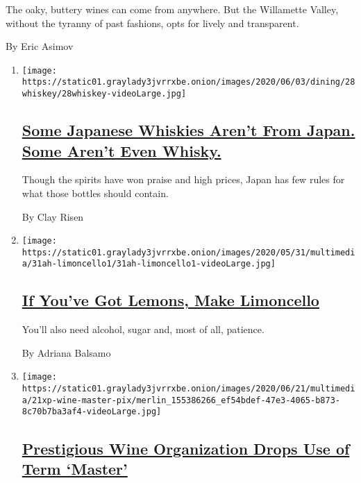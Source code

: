 \begin{enumerate}
\begin{enumerate}
    The oaky, buttery wines can come from anywhere. But the Willamette
    Valley, without the tyranny of past fashions, opts for lively and
    transparent.

    By Eric Asimov
  \end{enumerate}
\end{enumerate}

\begin{enumerate}
\def\labelenumi{\arabic{enumi}.}
\item
  \texttt{[image: https://static01.graylady3jvrrxbe.onion/images/2020/06/03/dining/28whiskey/28whiskey-videoLarge.jpg]}

  \hypertarget{some-japanese-whiskies-arent-from-japan-some-arent-even-whisky}{%
  \subsection{\texorpdfstring{\href{/2020/05/29/dining/japanese-whisky.html}{Some
  Japanese Whiskies Aren't From Japan. Some Aren't Even
  Whisky.}}{Some Japanese Whiskies Aren't From Japan. Some Aren't Even Whisky.}}\label{some-japanese-whiskies-arent-from-japan-some-arent-even-whisky}}

  Though the spirits have won praise and high prices, Japan has few
  rules for what those bottles should contain.

  By Clay Risen
\item
  \texttt{[image: https://static01.graylady3jvrrxbe.onion/images/2020/05/31/multimedia/31ah-limoncello1/31ah-limoncello1-videoLarge.jpg]}

  \hypertarget{if-youve-got-lemons-make-limoncello}{%
  \subsection{\texorpdfstring{\href{/2020/05/29/at-home/coronavirus-how-to-make-limoncello.html}{If
  You've Got Lemons, Make
  Limoncello}}{If You've Got Lemons, Make Limoncello}}\label{if-youve-got-lemons-make-limoncello}}

  You'll also need alcohol, sugar and, most of all, patience.

  By Adriana Balsamo
\item
  \texttt{[image: https://static01.graylady3jvrrxbe.onion/images/2020/06/21/multimedia/21xp-wine-master-pix/merlin\_155386266\_ef54bdef-47e3-4065-b873-8c70b7ba3af4-videoLarge.jpg]}

  \hypertarget{prestigious-wine-organization-drops-use-of-term-master}{%
  \subsection{\texorpdfstring{\href{/2020/06/22/us/wine-master.html}{Prestigious
  Wine Organization Drops Use of Term
  `Master'}}{Prestigious Wine Organization Drops Use of Term `Master'}}\label{prestigious-wine-organization-drops-use-of-term-master}}


\end{enumerate}
